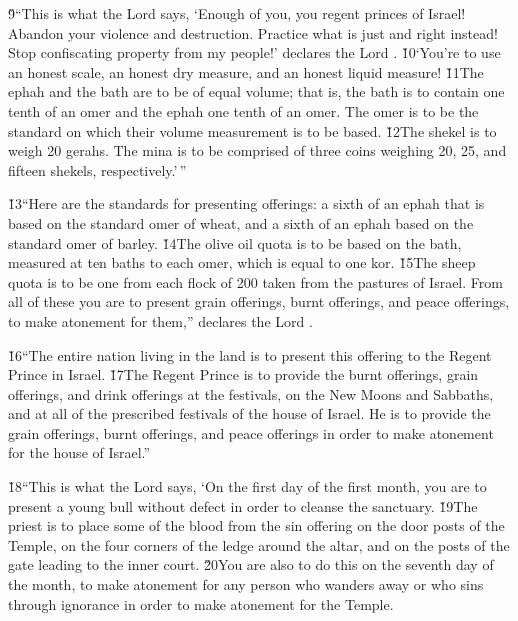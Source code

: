 \v{9}``This is what the Lord  says, `Enough of you, you regent princes of Israel! Abandon your violence and destruction. Practice what is just and right instead! Stop confiscating property from my people!' declares the Lord . \v{10}`You're to use an honest scale, an honest dry measure, and an honest liquid measure! \v{11}The ephah and the bath are to be of equal volume; that is, the bath is to contain one tenth of an omer and the ephah one tenth of an omer. The omer is to be the standard on which their volume measurement is to be based. \v{12}The shekel is to weigh 20 gerahs. The mina is to be comprised of three coins weighing 20, 25, and fifteen shekels, respectively.'\,''

\v{13}``Here are the standards for presenting offerings: a sixth of an ephah that is based on the standard omer of wheat, and a sixth of an ephah based on the standard omer of barley. \v{14}The olive oil quota is to be based on the bath, measured at ten baths to each omer, which is equal to one kor. \v{15}The sheep quota is to be one from each flock of 200 taken from the pastures of Israel. From all of these you are to present grain offerings, burnt offerings, and peace offerings, to make atonement for them,'' declares the Lord .

\v{16}``The entire nation living in the land is to present this offering to the Regent Prince in Israel. \v{17}The Regent Prince is to provide the burnt offerings, grain offerings, and drink offerings at the festivals, on the New Moons and Sabbaths, and at all of the prescribed festivals of the house of Israel. He is to provide the grain offerings, burnt offerings, and peace offerings in order to make atonement for the house of Israel.''

\v{18}``This is what the Lord  says, `On the first day of the first month, you are to present a young bull without defect in order to cleanse the sanctuary. \v{19}The priest is to place some of the blood from the sin offering on the door posts of the Temple, on the four corners of the ledge around the altar, and on the posts of the gate leading to the inner court. \v{20}You are also to do this on the seventh day of the month, to make atonement for any person who wanders away or who sins through ignorance in order to make atonement for the Temple.

